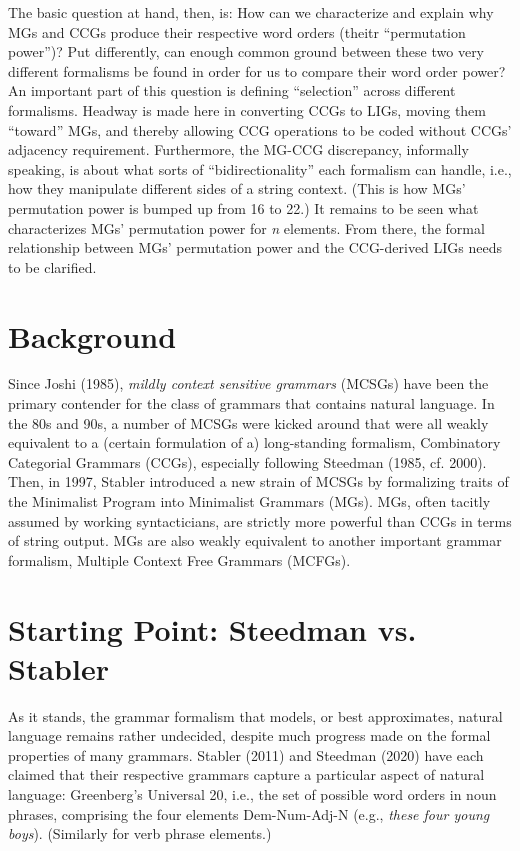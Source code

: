\documentclass[12pt]{article}
\begin{document}
\noindent The basic question at hand, then, is: How can we characterize and explain why MGs and CCGs produce their respective word orders (theitr ``permutation power'')? Put differently, can enough common ground between these two very different formalisms be found in order for us to compare their word order power? An important part of this question is defining ``selection'' across different formalisms. Headway is made here in converting CCGs to LIGs, moving them ``toward'' MGs, and thereby allowing CCG operations to be coded without CCGs' adjacency requirement. Furthermore, the MG-CCG discrepancy, informally speaking, is about what sorts of ``bidirectionality'' each formalism can handle, i.e., how they manipulate different sides of a string context. (This is how MGs' permutation power is bumped up from 16 to 22.) It remains to be seen what characterizes MGs' permutation power for \textit{n} elements. From there, the formal relationship between MGs' permutation power and the CCG-derived LIGs needs to be clarified.

\section{Background}

\noindent Since Joshi (1985), \textit{mildly context sensitive grammars} (MCSGs) have been the primary contender for the class of grammars that contains natural language. In the 80s and 90s, a number of MCSGs were kicked around that were all weakly equivalent to a (certain formulation of a) long-standing formalism, Combinatory Categorial Grammars (CCGs), especially following Steedman (1985, cf. 2000). Then, in 1997, Stabler introduced a new strain of MCSGs by formalizing traits of the Minimalist Program into Minimalist Grammars (MGs). MGs, often tacitly assumed by working syntacticians, are strictly more powerful than CCGs in terms of string output. MGs are also weakly equivalent to another important grammar formalism, Multiple Context Free Grammars (MCFGs).


\section{Starting Point: Steedman vs. Stabler}


\noindent As it stands, the grammar formalism that models, or best approximates, natural language remains rather undecided, despite much progress made on the formal properties of many grammars. Stabler (2011) and Steedman (2020) have each claimed that their respective grammars capture a particular aspect of natural language: Greenberg's Universal 20, i.e., the set of possible word orders in noun  phrases, comprising the four elements Dem-Num-Adj-N (e.g., \textit{these four young boys}). (Similarly for verb phrase elements.) \\
\end{document}
